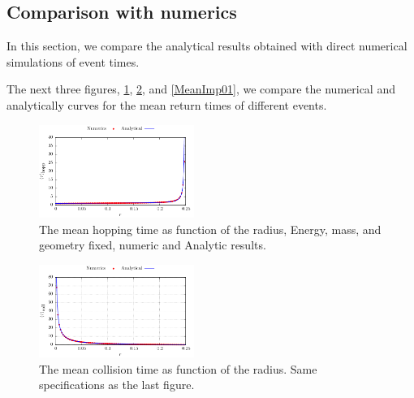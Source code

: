 \documentclass[superscriptaddress,pre,reprint,showpacs,onecolumn]{revtex4-1}
\begin{document}


\subsection{Comparison with numerics}

In this section, we compare the analytical results obtained with direct numerical simulations of
event times.



The next three figures, \ref{MeanHopp01}, \ref{MeanCol01}, and \ref{MeanImp01},  
we compare the
numerical and analytically curves for the mean return times of different events.

\begin{figure}[h]
  \centering
  \includegraphics[width=0.45\textwidth]{./FigurasPerfectas/HopTimes02.pdf}
  \caption{The mean hopping time as function of the radius, Energy, mass, 
and geometry fixed, numeric and Analytic results.}\label{MeanHopp01}
\end{figure}

\begin{figure}[h]
  \centering
  \includegraphics[width=0.45\textwidth]{./FigurasPerfectas/CollitionTimes02.pdf}
  \caption{The mean collision time as function of the radius. Same
    specifications as the last figure. }\label{MeanCol01}
\end{figure}
\end{document}
